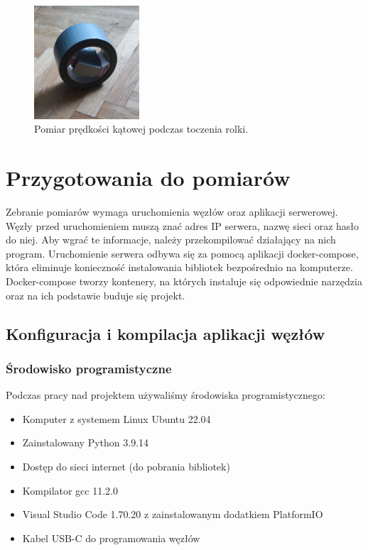 \documentclass[12pt,oneside,a4paper]{book}
\theoremstyle{break}
\begin{document}
\begin{figure}[H]
    \begin{center}
        \includegraphics[width=0.35\textwidth]{test_kula.png}
        \caption{Pomiar prędkości kątowej podczas toczenia rolki.}
        \label{rys:test_kula}
    \end{center}
\end{figure}

\section{Przygotowania do pomiarów}
Zebranie pomiarów wymaga uruchomienia węzłów oraz aplikacji serwerowej.
Węzły przed uruchomieniem muszą znać adres IP serwera, 
nazwę sieci oraz hasło do niej. Aby wgrać te informacje, należy 
przekompilować działający na nich program. 
Uruchomienie serwera odbywa się za pomocą aplikacji docker-compose,
która eliminuje konieczność instalowania bibliotek bezpośrednio 
na komputerze. Docker-compose tworzy kontenery, na których instaluje
się odpowiednie narzędzia oraz na ich podstawie buduje się projekt.

\subsection{Konfiguracja i kompilacja aplikacji węzłów}

\subsubsection{Środowisko programistyczne}
Podczas pracy nad projektem używaliśmy środowiska programistycznego:
\begin{itemize}
    \item Komputer z systemem Linux Ubuntu 22.04
    \item Zainstalowany Python 3.9.14
    \item Dostęp do sieci internet (do pobrania bibliotek)
    \item Kompilator gcc 11.2.0
    \item Visual Studio Code 1.70.20 z zainstalowanym dodatkiem PlatformIO
    \item Kabel USB-C do programowania węzłów
\end{itemize}
\end{document}

